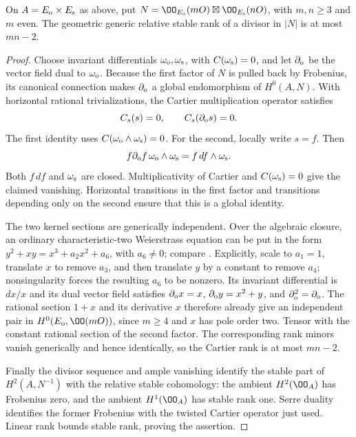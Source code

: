 \begin{lemma}
\label{lem:DE-A3-mixed-even-bound}
On $A=E_{\rm o}\times E_{\rm s}$ as above, put
$N=\OO_{E_{\rm o}}(mO)\boxtimes\OO_{E_{\rm s}}(nO)$, with
$m,n\ge3$ and $m$ even.  The geometric generic relative stable
rank of a divisor in $|N|$ is at most $mn-2$.
\end{lemma}
\begin{proof}
Choose invariant differentials $\omega_{\rm o},\omega_{\rm s}$,
with $C(\omega_{\rm s})=0$, and let $\partial_{\rm o}$ be the
vector field dual to $\omega_{\rm o}$.
Because the first factor of $N$ is pulled back by Frobenius,
its canonical connection makes $\partial_{\rm o}$ a global
endomorphism of $H^0(A,N)$.  With horizontal rational
trivializations, the Cartier multiplication operator satisfies
\[
                        C_s(s)=0,\qquad
                        C_s(\partial_{\rm o}s)=0.
\]
The first identity uses $C(\omega_{\rm o}\wedge\omega_{\rm s})=0$.
For the second, locally write $s=f$.  Then
\[
 f\partial_{\rm o}f\,\omega_{\rm o}\wedge\omega_{\rm s}
                      =f\,df\wedge\omega_{\rm s}.
\]
Both $f\,df$ and $\omega_{\rm s}$ are closed.  Multiplicativity
of Cartier and $C(\omega_{\rm s})=0$ give the claimed vanishing.
Horizontal transitions in the first factor and transitions
depending only on the second ensure that this is a global identity.

The two kernel sections are generically independent.
Over the algebraic closure, an ordinary characteristic-two
Weierstrass equation can be put in the form
$y^2+xy=x^3+a_2x^2+a_6$, with $a_6\ne0$; compare
\cite[Example~5.26, p.~82]{EdixhovenVanDerGeerMoonenAV}.
Explicitly, scale to $a_1=1$, translate $x$ to remove $a_3$,
and then translate $y$ by a constant to remove $a_4$;
nonsingularity forces the resulting $a_6$ to be nonzero.
Its invariant differential is $dx/x$ and its dual vector field
satisfies $\partial_{\rm o}x=x$,
$\partial_{\rm o}y=x^2+y$, and
$\partial_{\rm o}^2=\partial_{\rm o}$.
The rational section $1+x$ and its derivative
$x$ therefore already give an independent pair in
$H^0(E_{\rm o},\OO(mO))$, since $m\ge4$ and $x$ has pole order two.
Tensor with the constant rational section of the second factor.
The corresponding rank minors vanish generically and hence
identically, so the Cartier rank is at most $mn-2$.

Finally the divisor sequence and ample vanishing identify the
stable part of $H^2(A,N^{-1})$ with the relative stable cohomology:
the ambient $H^2(\OO_A)$ has Frobenius zero, and the ambient
$H^1(\OO_A)$ has stable rank one.  Serre duality identifies the
former Frobenius with the twisted Cartier operator just used.
Linear rank bounds stable rank, proving the assertion.
\end{proof}

